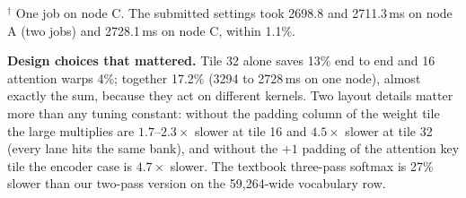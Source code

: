 \documentclass{article}
\begin{document}
\begin{table}[t]
\caption{ASR cost on an RTX 2080 Ti, ms per transcription of the test recording (mean of 3 runs; $\pm$ standard deviation on the left). Left: the first three rows are one job on node A (PyTorch, ours, PyTorch); rows marked $\dagger$ are one job on node C. Right: kernels switched on one task at a time with the handout settings (one job, node B). All runs transcribe the test recording exactly.}
\label{tab:asr}
\begin{center}
\footnotesize
\setlength{\tabcolsep}{4pt}
\end{center}
\footnotesize{$^\dagger$ One job on node C. The submitted settings took 2698.8 and 2711.3\,ms on node A (two jobs) and 2728.1\,ms on node C, within 1.1\%.}
\end{table}

\textbf{Design choices that mattered.} Tile 32 alone saves 13\% end to end and 16 attention warps 4\%; together 17.2\% (3294 to 2728\,ms on one node), almost exactly the sum, because they act on different kernels. Two layout details matter more than any tuning constant: without the padding column of the weight tile the large multiplies are $1.7$--$2.3\times$ slower at tile 16 and $4.5\times$ slower at tile 32 (every lane hits the same bank), and without the $+1$ padding of the attention key tile the encoder case is $4.7\times$ slower. The textbook three-pass softmax is 27\% slower than our two-pass version on the 59{,}264-wide vocabulary row.
\end{document}
